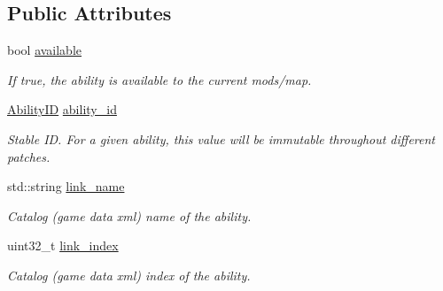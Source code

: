 \subsection*{Public Attributes}
\begin{DoxyCompactItemize}
\item 
\mbox{\label{structsc2_1_1_ability_data_a1ca4424f072e90cddb81b5fe3b0595f2}} 
bool \hyperlink{structsc2_1_1_ability_data_a1ca4424f072e90cddb81b5fe3b0595f2}{available}
\begin{DoxyCompactList}\small\item\em If true, the ability is available to the current mods/map. \end{DoxyCompactList}\item 
\mbox{\label{structsc2_1_1_ability_data_a5ccb4a8292936f8bc0cda4f1febc3476}} 
\hyperlink{classsc2_1_1_s_c2_type}{Ability\+ID} \hyperlink{structsc2_1_1_ability_data_a5ccb4a8292936f8bc0cda4f1febc3476}{ability\+\_\+id}
\begin{DoxyCompactList}\small\item\em Stable ID. For a given ability, this value will be immutable throughout different patches. \end{DoxyCompactList}\item 
\mbox{\label{structsc2_1_1_ability_data_a32213c23964c6803cca16bc5055861ff}} 
std\+::string \hyperlink{structsc2_1_1_ability_data_a32213c23964c6803cca16bc5055861ff}{link\+\_\+name}
\begin{DoxyCompactList}\small\item\em Catalog (game data xml) name of the ability. \end{DoxyCompactList}\item 
\mbox{\label{structsc2_1_1_ability_data_a915bb3b60f7b3a664c13636292c64aae}} 
uint32\+\_\+t \hyperlink{structsc2_1_1_ability_data_a915bb3b60f7b3a664c13636292c64aae}{link\+\_\+index}
\begin{DoxyCompactList}\small\item\em Catalog (game data xml) index of the ability. \end{DoxyCompactList}\item 
\mbox{\label{structsc2_1_1_ability_data_a866b35972f5337e031215963d5fca922}} 

\end{DoxyCompactItemize}

